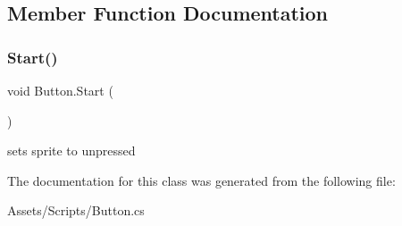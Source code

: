 \subsection{Member Function Documentation}
\mbox{\label{class_button_a1ca1f623a8d5f7e9453eee7698e216ec}} 
\subsubsection{\texorpdfstring{Start()}{Start()}}
{\footnotesize\ttfamily void Button.\+Start (\begin{DoxyParamCaption}{ }\end{DoxyParamCaption})\hspace{0.3cm}{\ttfamily [inline]}}

sets sprite to unpressed 

The documentation for this class was generated from the following file\+:\begin{DoxyCompactItemize}
\item 
Assets/\+Scripts/Button.\+cs\end{DoxyCompactItemize}
